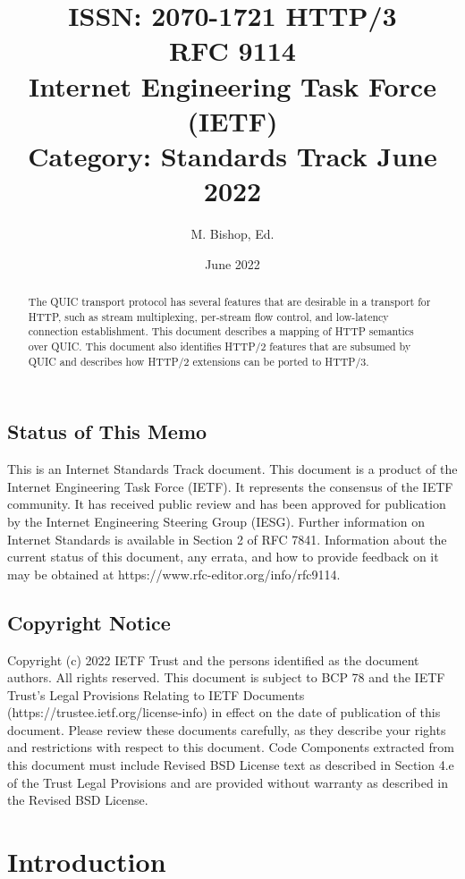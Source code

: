 \documentclass{article}
\title{ISSN: 2070-1721 HTTP/3\\[1em]
\large RFC 9114\\
Internet Engineering Task Force (IETF)\\
Category: Standards Track                                      June 2022}
\author{M. Bishop, Ed.}
\date{June 2022}
\begin{document}
\maketitle

\begin{abstract}
The QUIC transport protocol has several features that are desirable in a transport for HTTP, such as stream multiplexing, per-stream flow control, and low-latency connection establishment.  This document describes a mapping of HTTP semantics over QUIC.  This document also identifies HTTP/2 features that are subsumed by QUIC and describes how HTTP/2 extensions can be ported to HTTP/3.
\end{abstract}

\subsection*{Status of This Memo}
This is an Internet Standards Track document. This document is a product of the Internet Engineering Task Force (IETF).  It represents the consensus of the IETF community.  It has received public review and has been approved for publication by the Internet Engineering Steering Group (IESG).  Further information on Internet Standards is available in Section 2 of RFC 7841. Information about the current status of this document, any errata, and how to provide feedback on it may be obtained at https://www.rfc-editor.org/info/rfc9114.

\subsection*{Copyright Notice}
Copyright (c) 2022 IETF Trust and the persons identified as the document authors.  All rights reserved. This document is subject to BCP 78 and the IETF Trust's Legal Provisions Relating to IETF Documents (https://trustee.ietf.org/license-info) in effect on the date of publication of this document.  Please review these documents carefully, as they describe your rights and restrictions with respect to this document.  Code Components extracted from this document must include Revised BSD License text as described in Section 4.e of the Trust Legal Provisions and are provided without warranty as described in the Revised BSD License.

\tableofcontents
\newpage

\section{Introduction}
\end{document}
